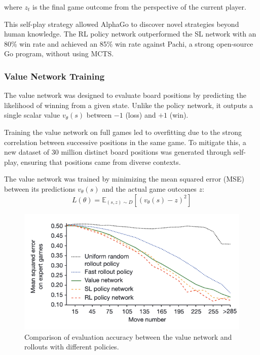 where \( z_t \) is the final game outcome from the perspective of the current
player.

This self-play strategy allowed AlphaGo to discover novel strategies beyond
human knowledge. The RL policy network outperformed the SL network with an 80\%
win rate and achieved an 85\% win rate against Pachi, a strong open-source Go
program, without using MCTS.

\subsubsection{Value Network Training}
The value network was designed to evaluate board positions by predicting the
likelihood of winning from a given state. Unlike the policy network, it outputs
a single scalar value \( v_\theta(s) \) between \(-1\) (loss) and \(+1\) (win).

Training the value network on full games led to overfitting due to the strong
correlation between successive positions in the same game. To mitigate this, a
new dataset of 30 million distinct board positions was generated through
self-play, ensuring that positions came from diverse contexts.

The value network was trained by minimizing the mean squared error (MSE)
between its predictions \( v_\theta(s) \) and the actual game outcomes \( z \):
\begin{equation}
    L(\theta) = \mathbb{E}_{(s, z) \sim D} \left[ (v_\theta(s) - z)^2 \right]
\end{equation}

\begin{figure}[htbp]
    \centering
    \includegraphics[width=\linewidth, height=0.2\textheight, keepaspectratio]{mse.png}
    \caption{Comparison of evaluation
accuracy between the value network and rollouts with different policies.}
\end{figure}

